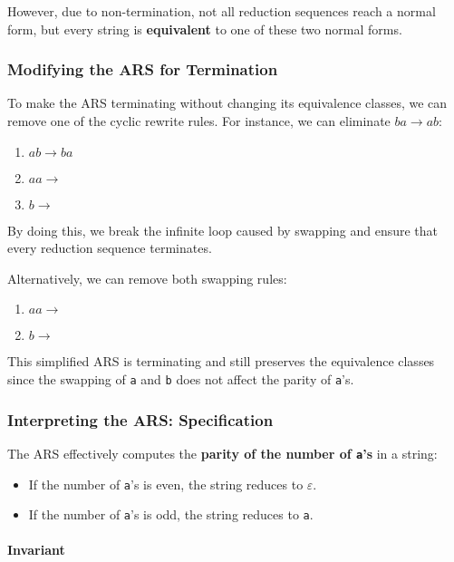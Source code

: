 \documentclass{article}
\begin{document}
However, due to non-termination, not all reduction sequences reach a normal form, but every string is \textbf{equivalent} to one of these two normal forms.

\subsubsection*{Modifying the ARS for Termination}

To make the ARS terminating without changing its equivalence classes, we can remove one of the cyclic rewrite rules. For instance, we can eliminate $ba \to ab$:

\begin{enumerate}
    \item $ab \to ba$
    \item $aa \to$
    \item $b \to$
\end{enumerate}

By doing this, we break the infinite loop caused by swapping and ensure that every reduction sequence terminates.

Alternatively, we can remove both swapping rules:

\begin{enumerate}
    \item $aa \to$
    \item $b \to$
\end{enumerate}

This simplified ARS is terminating and still preserves the equivalence classes since the swapping of \texttt{a} and \texttt{b} does not affect the parity of \texttt{a}'s.

\subsubsection*{Interpreting the ARS: Specification}

The ARS effectively computes the \textbf{parity of the number of \texttt{a}'s} in a string:

\begin{itemize}
    \item If the number of \texttt{a}'s is even, the string reduces to $\varepsilon$.
    \item If the number of \texttt{a}'s is odd, the string reduces to \texttt{a}.
\end{itemize}

\paragraph{Invariant}
\end{document}
